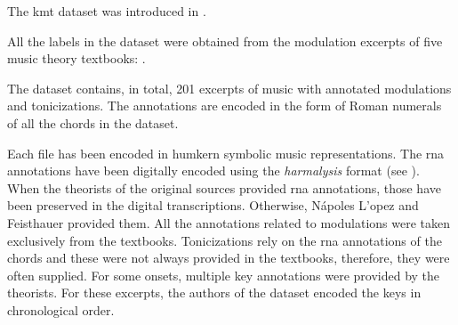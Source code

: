 
The \gls{kmt} dataset was introduced in
\textcite{napoleslopez2020local}.

All the labels in the dataset were obtained from the
modulation excerpts of five music theory textbooks:
\textcite{aldwell2019harmony, kostka2008tonal,
reger1904supplement, rimskikorsakov1886practical,
tchaikovsky1872guide}.

The dataset contains, in total, 201 excerpts of music with
annotated modulations and tonicizations. The annotations are
encoded in the form of Roman numerals of all the chords in
the dataset. 

Each file has been encoded in \gls{humkern} symbolic music
representations. The \gls{rna} annotations have been
digitally encoded using the \emph{harmalysis} format (see
). When the theorists of the
original sources provided \gls{rna} annotations, those have
been preserved in the digital transcriptions. Otherwise,
N\'apoles L'opez and Feisthauer provided them. All the
annotations related to modulations were taken exclusively
from the textbooks. Tonicizations rely on the \gls{rna}
annotations of the chords and these were not always provided
in the textbooks, therefore, they were often supplied. For
some onsets, multiple key annotations were provided by the
theorists. For these excerpts, the authors of the dataset
encoded the keys in chronological order.
